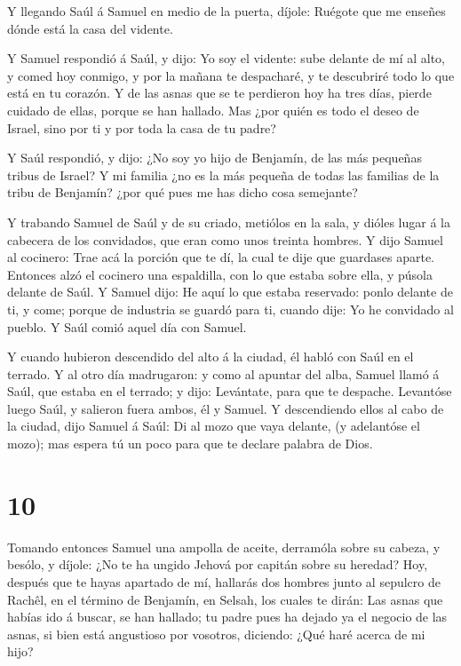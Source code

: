  Y llegando Saúl á Samuel en medio de la puerta, díjole:
Ruégote que me enseñes dónde está la casa del vidente.

 Y Samuel respondió á Saúl, y dijo: Yo soy el vidente: sube
delante de mí al alto, y comed hoy conmigo, y por la mañana te
despacharé, y te descubriré todo lo que está en tu corazón.
 Y de las asnas que se te perdieron hoy ha tres días,
pierde cuidado de ellas, porque se han hallado. Mas ¿por quién es todo
el deseo de Israel, sino por ti y por toda la casa de tu padre?

 Y Saúl respondió, y dijo: ¿No soy yo hijo de Benjamín, de
las más pequeñas tribus de Israel? Y mi familia ¿no es la más pequeña de
todas las familias de la tribu de Benjamín? ¿por qué pues me has dicho
cosa semejante?

 Y trabando Samuel de Saúl y de su criado, metiólos en la
sala, y dióles lugar á la cabecera de los convidados, que eran como unos
treinta hombres.  Y dijo Samuel al cocinero: Trae acá la
porción que te dí, la cual te dije que guardases aparte. 
Entonces alzó el cocinero una espaldilla, con lo que estaba sobre ella,
y púsola delante de Saúl. Y Samuel dijo: He aquí lo que estaba
reservado: ponlo delante de ti, y come; porque de industria se guardó
para ti, cuando dije: Yo he convidado al pueblo. Y Saúl comió aquel día
con Samuel.

 Y cuando hubieron descendido del alto á la ciudad, él
habló con Saúl en el terrado.  Y al otro día madrugaron: y
como al apuntar del alba, Samuel llamó á Saúl, que estaba en el terrado;
y dijo: Levántate, para que te despache. Levantóse luego Saúl, y
salieron fuera ambos, él y Samuel.  Y descendiendo ellos al
cabo de la ciudad, dijo Samuel á Saúl: Di al mozo que vaya delante, (y
adelantóse el mozo); mas espera tú un poco para que te declare palabra
de Dios.

\hypertarget{section-9}{%
\section{10}\label{section-9}}

 Tomando entonces Samuel una ampolla de aceite, derramóla
sobre su cabeza, y besólo, y díjole: ¿No te ha ungido Jehová por capitán
sobre su heredad?  Hoy, después que te hayas apartado de mí,
hallarás dos hombres junto al sepulcro de Rachêl, en el término de
Benjamín, en Selsah, los cuales te dirán: Las asnas que habías ido á
buscar, se han hallado; tu padre pues ha dejado ya el negocio de las
asnas, si bien está angustioso por vosotros, diciendo: ¿Qué haré acerca
de mi hijo?

